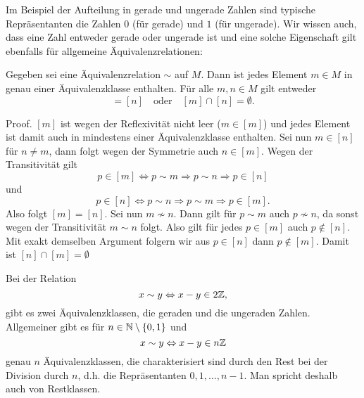 Im Beispiel der Aufteilung in gerade und ungerade Zahlen sind typische Repräsentanten die Zahlen \(0\) (für gerade) und \(1\) (für ungerade). Wir wissen auch, dass eine Zahl entweder gerade oder ungerade ist und eine solche Eigenschaft gilt ebenfalls für allgemeine Äquivalenzrelationen:
\label{grundlagen/mengenlogik:lemma-9}
\begin{lemma}{}{}



Gegeben sei eine Äquivalenzrelation \(\sim\) auf \(M\). Dann ist jedes Element \(m \in M\) in genau einer Äquivalenzklasse enthalten. Für alle \(m,n \in M\) gilt entweder
\begin{equation*}
[m] = [n] \quad \text{oder} \quad [m] \cap [n] = \emptyset .
\end{equation*}\end{lemma}

\begin{emphBox}{}{}
Proof.  \([m]\) ist wegen der Reflexivität nicht leer (\(m \in [m]\)) und jedes Element ist damit auch in mindestens einer Äquivalenzklasse enthalten. Sei nun \(m \in [n]\) für \(n \neq m\), dann folgt wegen der Symmetrie auch \(n \in [m]\). Wegen der Transitivität gilt
\begin{equation*}
p \in [m] \Leftrightarrow p \sim m \Rightarrow p \sim n \Rightarrow p \in [n]
\end{equation*}
und
\begin{equation*}
 p \in [n] \Leftrightarrow p \sim n \Rightarrow p \sim m \Rightarrow p \in [m].
\end{equation*}
Also folgt \([m]=[n]\). Sei nun \(m \not\sim n\). Dann gilt für \(p \sim m\) auch \(p \not\sim n\), da sonst wegen der Transitivität \(m \sim n\) folgt. Also gilt für jedes \(p \in [m]\) auch \(p \notin [n]\). Mit exakt demselben Argument folgern wir aus \(p \in [n]\) dann \(p \notin [m]\). Damit ist \([n] \cap [m] = \emptyset\)
\end{emphBox}

Bei der Relation
\begin{equation*}
 x \sim y \Leftrightarrow x-y \in 2 \mathbb{Z} ,
\end{equation*}
gibt es zwei Äquivalenzklassen, die geraden und die ungeraden Zahlen. Allgemeiner gibt es für \(n \in \mathbb{N} \setminus \{0,1\}\) und
\begin{equation*}
x \sim y \Leftrightarrow x - y \in n \mathbb{Z}
\end{equation*}
genau \(n\) Äquivalenzklassen, die charakterisiert sind durch den Rest bei der Division durch \(n\), d.h. die Repräsentanten \(0,1,\ldots,n-1\). Man spricht deshalb auch von Restklassen.


